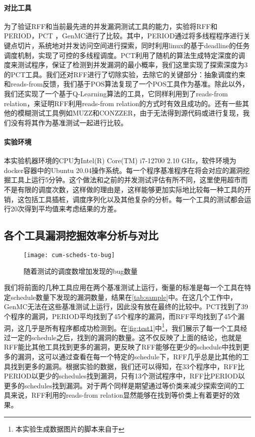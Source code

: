 \paragraph{对比工具}为了验证RFF和当前最先进的并发漏洞测试工具的能力，实验将RFF和PERIOD\cite{wen2022controlled}，PCT\cite{burckhardt2010randomized} ，GenMC\cite{kokologiannakis2019model, kokologiannakis2021genmc}进行了比较。其中，PERIOD通过将多线程程序进行关键点切片，系统地对并发访问空间进行探索，同时利用linux的基于deadline的任务调度机制，实现了可控的多线程调度。PCT利用了随机的算法生成特定深度的调度来测试程序，保证了检测到并发漏洞的最小概率，我们这里实现了探索深度为3的PCT工具。我们还对RFF进行了切除实验，去除它的关键部分：抽象调度约束和reads-from反馈，我们基于POS算法复现了一个POS工具作为基准。除此以外，我们还实现了一个基于Q-Learning算法的工具，它同样利用到了reads-from relation，来证明RFF利用reads-from relation的方式时有效且成功的。还有一些其他的模糊测试工具例如MUZZ\cite{chen2020muzz}和CONZZER\cite{jiang2022context}，由于无法得到源代码或进行复现，我们没有将其作为基准测试一起进行比较。

\paragraph{实验环境}本实验机器环境的CPU为Intel(R) Core(TM) i7-12700 2.10 GHz，软件环境为docker容器中的Ubuntu 20.04操作系统。每一个程序基准程序在将会对应的漏洞挖掘工具上运行5分钟。这个做法和之前的并发测试评估有所不同，这里使用超市而不是有限的调度次数，这样做的理由是，这样能够更加实际地比较每一种工具的开销，这包括工具插桩，调度序列化以及其他复杂的分析。每一个工具的测试都会运行20次得到平均值来考虑结果的方差。

\subsection{各个工具漏洞挖掘效率分析与对比}

\begin{figure}[ht]
    \centering
    \texttt{[image: cum-scheds-to-bug]}
    \caption{\label{fig:test1}随着测试的调度数增加发现的bug数量}
\end{figure}

我们将前面的几种工具应用在两个基准测试上运行，衡量的标准是每一个工具在特定schedule数量下发现的漏洞数量，结果在\autoref{tab:sample}中。在这几个工作中，GenMC无法在这些基准测试上运行，因此没有放在最终的比较中。PCT找到了39个程序的漏洞，PERIOD平均找到了45个程序的漏洞，而RFF平均找到了45个漏洞，这几乎是所有程序都成功检测到。在\autoref{fig:test1}中\footnote{本实验生成数据图片的脚本来自于\cite{wolff2024greybox}}，我们展示了每一个工具经过一定的schedule之后，找到的漏洞的数量。这不仅反映了上面的结论，也就是RFF能比其他工具找到更多的漏洞，更反映了RFF能够在更少的schedule中找到更多的漏洞，这可以通过查看在每一个特定的schedule下，RFF几乎总是比其他的工具找到更多的漏洞。根据实验的数据，我们还可以得知，在33个程序中，RFF比PERIOD以更少的schedules找到漏洞，只有13个测试程序中，RFF比PERIOD以更多的schedules找到漏洞。对于两个同样是期望通过等价类来减少探索空间的工具来说，RFF利用的reads-from relation显然能够在找到等价类上有着更好的效果。

